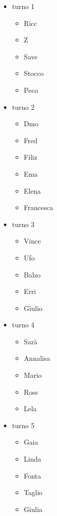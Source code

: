 \documentclass{article}
\begin{document}
    \begin{itemize}
        \item turno 1
        \begin{itemize}
            \item Ricc
            \item Z
            \item Save
            \item Stocco
            \item Peco
        \end{itemize}
        \item turno 2
        \begin{itemize}
            \item Dmo
            \item Fred
            \item Filiz
            \item Ema
            \item Elena
            \item Francesca
        \end{itemize}
        \item turno 3
        \begin{itemize}
            \item Vince
            \item Ufo
            \item Balzo
            \item Erri
            \item Giulio
        \end{itemize}
        \item turno 4
        \begin{itemize}
            \item Sarà
            \item Annalisa
            \item Mario
            \item Ross
            \item Lela
        \end{itemize}
        \item turno 5
        \begin{itemize}
            \item Gaia
            \item Linda
            \item Fonta
            \item Taglio
            \item Giulia
        \end{itemize}
        
        
        
    \end{itemize}
\end{document}
